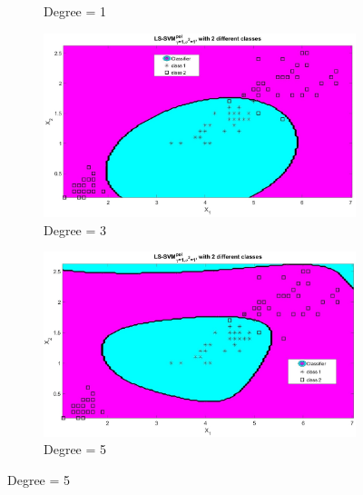 \documentclass[12pt]{report}
\begin{document}
{\begin{figure}[!htbp]
\begin{subfigure}{.33\textwidth}
 		\caption{Degree = 1}
 		\label{fig:deg(1)}
 	\end{subfigure}%
 	\begin{subfigure}{.33\textwidth}
 		\centering
 		\includegraphics[height=0.8\linewidth,width=1\linewidth]{Ex1.3_deg(3).jpg}
 		\caption{Degree = 3}
 		\label{fig:deg31)}
 	\end{subfigure}%
 	\begin{subfigure}{.33\textwidth}
 		\centering
 		\includegraphics[height=0.8\linewidth,width=1\linewidth]{Ex1.3_deg(5).jpg}
 		\caption{Degree = 5}
 		\label{fig:deg(5)}
 	\end{subfigure}

\end{figure}}
\end{document}
